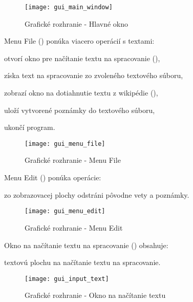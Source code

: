 \begin{figure}[H]
	\begin{center}\texttt{[image: gui\_main\_window]}\end{center}
	\caption[Grafické rozhranie - Hlavné okno]{Grafické rozhranie - Hlavné okno}\label{appendix:gui:main_window}
\end{figure}

Menu File () ponúka viacero operácií s textami:
\begin{my_enumerate}
	\item otvorí okno pre načítanie textu na spracovanie (),
	\item získa text na spracovanie zo zvoleného textového súboru,
	\item zobrazí okno na dotiahnutie textu z wikipédie (),
	\item uloží vytvorené poznámky do textového súboru,
	\item ukončí program.
\end{my_enumerate}

\begin{figure}[H]
	\begin{center}\texttt{[image: gui\_menu\_file]}\end{center}
	\caption[Grafické rozhranie - Menu File]{Grafické rozhranie - Menu File}\label{appendix:gui:menu_file}
\end{figure}

Menu Edit () ponúka operácie:
\begin{my_enumerate}
	\item zo zobrazovacej plochy odstráni pôvodne vety a poznámky.
\end{my_enumerate}

\begin{figure}[H]
	\begin{center}\texttt{[image: gui\_menu\_edit]}\end{center}
	\caption[Grafické rozhranie - Menu Edit]{Grafické rozhranie - Menu Edit}\label{appendix:gui:menu_edit}
\end{figure}

Okno na načítanie textu na spracovanie () obsahuje:
\begin{my_enumerate}
	\item textovú plochu na načítanie textu na spracovanie.
\end{my_enumerate}
\begin{figure}[H]
	\begin{center}\texttt{[image: gui\_input\_text]}\end{center}
	\caption[Grafické rozhranie - Okno na načítanie textu]{Grafické rozhranie - Okno na načítanie textu}\label{appendix:gui:input_window}
\end{figure}

